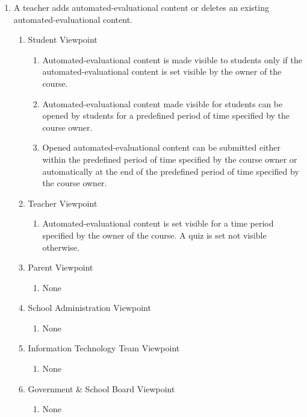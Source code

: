 \documentclass[]{article}
\begin{document}
\begin{enumerate}[{BE}1.]
	\item A teacher adds automated-evaluational content or deletes an existing automated-evaluational content.
	\begin{enumerate}[{VP2}.1]
		\item Student Viewpoint
			\begin{enumerate}
				\item Automated-evaluational content is made visible to students only if the automated-evaluational content is set visible by the owner of the course.
				\item Automated-evaluational content made visible for students can be opened by students for a predefined period of time specified by the course owner.
				\item Opened automated-evaluational content can be submitted either within the predefined period of time specified by the course owner or automatically at the end of the predefined period of time specified by the course owner.
			\end{enumerate}
		\item Teacher Viewpoint
			\begin{enumerate}
				\item Automated-evaluational content is set visible for a time period specified by the owner of the course. A quiz is set not visible otherwise.
			\end{enumerate}
		\item Parent Viewpoint
			\begin{enumerate}
				\item None
			\end{enumerate}
		\item School Administration Viewpoint
			\begin{enumerate}
				\item None
			\end{enumerate}
		\item Information Technology Team Viewpoint
			\begin{enumerate}
				\item None
			\end{enumerate}
		\item Government \& School Board Viewpoint
			\begin{enumerate}
				\item None
			\end{enumerate}
	\end{enumerate}


\end{enumerate}
\end{document}
